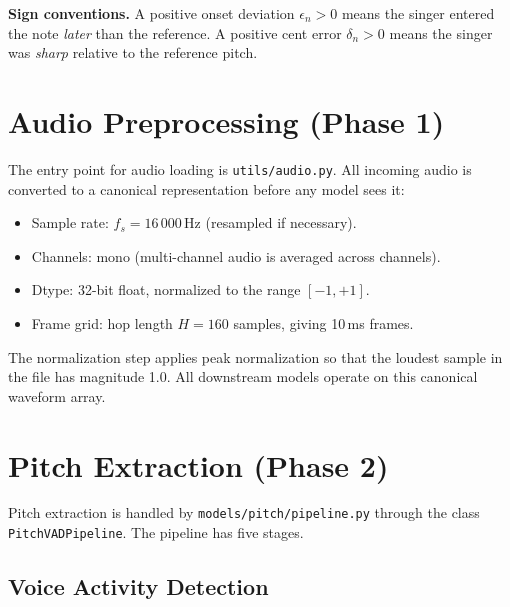 \documentclass[11pt,letterpaper]{article}
\begin{document}
\textbf{Sign conventions.}
A positive onset deviation $\epsilon_n > 0$ means the singer entered the note
\emph{later} than the reference.
A positive cent error $\delta_n > 0$ means the singer was \emph{sharp}
relative to the reference pitch.

\section{Audio Preprocessing (Phase 1)}

The entry point for audio loading is \texttt{utils/audio.py}.
All incoming audio is converted to a canonical representation before any model
sees it:

\begin{itemize}[noitemsep]
  \item Sample rate: $f_s = 16\,000$\,Hz (resampled if necessary).
  \item Channels: mono (multi-channel audio is averaged across channels).
  \item Dtype: 32-bit float, normalized to the range $[-1, +1]$.
  \item Frame grid: hop length $H = 160$ samples, giving 10\,ms frames.
\end{itemize}

The normalization step applies peak normalization so that the loudest sample
in the file has magnitude 1.0.
All downstream models operate on this canonical waveform array.

\section{Pitch Extraction (Phase 2)}

Pitch extraction is handled by \texttt{models/pitch/pipeline.py} through the
class \texttt{PitchVADPipeline}.
The pipeline has five stages.

\subsection{Voice Activity Detection}
\end{document}

